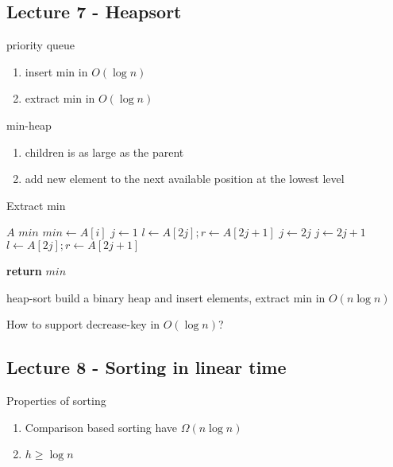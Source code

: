 \documentclass[../../main/main.tex]{subfiles}
\begin{document}
\subsection{Lecture 7 - Heapsort}
priority queue
\begin{enumerate}
  \item insert min in $O(\log n)$
  \item extract min in $O(\log n)$
\end{enumerate}

\begin{definition}
  min-heap
  \begin{enumerate}
    \item children is as large as the parent
    \item add new element to the next available position at the lowest level 
  \end{enumerate}
\end{definition}

\begin{algorithm}
  \algrenewcommand{}
  \algrenewcommand{}
  \caption{Extract min}\label{alg:}
  \begin{algorithmic}[1]
    \Require $A$
    \Ensure $min$
    \State $min \gets A[i]$
    \State {}
    \State {}
    \State $j \gets 1$
    \State $l \gets A[2j]; r \gets A[2j+1]$
     
    \State {}
    \State $j \gets 2j$
    \Else
    \State {}
    \State $j \gets 2j+1$
    \EndIf
    \State $l \gets A[2j]; r \gets A[2j+1]$

    \State \textbf{return} $min$
  \end{algorithmic}
\end{algorithm}

\begin{definition}
  heap-sort
  \newline
  build a binary heap and insert elements, extract min in $O(n\log n)$
\end{definition}

\begin{remark}
  How to support decrease-key in $O(\log n)$?
\end{remark}
\subsection{Lecture 8 - Sorting in linear time}
\begin{claim}
  Properties of sorting
  \begin{enumerate}
    \item Comparison based sorting have $\Omega(n\log n)$
    \item $h\ge \log n$
  \end{enumerate}
\end{claim}
\end{document}
